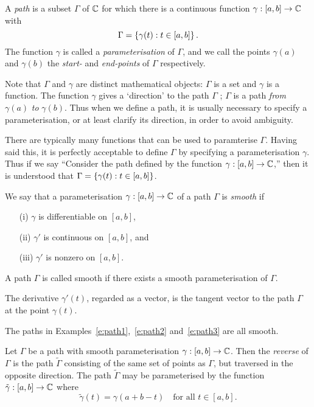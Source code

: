 \begin{definition}
A \emph{path} is a subset $\Gamma$ of $\mathbb{C}$ for which there is a continuous function $\gamma : [a,b] \to \mathbb{C}$ with
\[
\Gamma = \left\{ \gamma (t) : t \in [a,b] \right\}.
\]
The function $\gamma$ is called a \emph{parameterisation} of $\Gamma$, and we call the points $\gamma(a)$ and $\gamma(b)$ the \emph{start-} and \emph{end-points} of $\Gamma$ respectively.
\end{definition}
Note that $\Gamma$ and $\gamma$ are distinct mathematical objects: $\Gamma$ is a set and $\gamma$ is a function.  The function $\gamma$ gives a `direction' to the path $\Gamma$ ; $\Gamma$ is a path \emph{from} $\gamma (a)$ \emph{to} $\gamma(b)$. Thus when we define a path, it is usually necessary to specify a parameterisation, or at least clarify its direction, in order to avoid ambiguity.

There are typically many functions that can be used to paramterise $\Gamma$.  
Having said this, it is perfectly acceptable to define $\Gamma$ by specifying a parameterisation $\gamma$.  Thus if we say ``Consider the path defined by the function $\gamma:[a,b] \to \mathbb{C}$,'' then it is understood that $\Gamma = \left\{ \gamma (t) : t \in [a,b] \right\}$.


\begin{definition}
 We say that a parameterisation $\gamma:[a,b] \to \mathbb{C}$ of a path $\Gamma$ is \emph{smooth} if
\begin{enumerate}
\item[(i)] $\gamma$ is differentiable on $[a,b]$,
\item[(ii)] $\gamma'$ is continuous on $[a,b]$, and
\item[(iii)] $\gamma' $ is nonzero on $[a,b]$.
\end{enumerate}
A path $\Gamma$ is called smooth if there exists a smooth parameterisation of $\Gamma$.
\end{definition}

The derivative $\gamma'(t)$, regarded as a vector, is the tangent vector to the path $\Gamma$ at the point $\gamma (t)$.

The paths in Examples~\ref{e:path1},~\ref{e:path2} and~\ref{e:path3} are all smooth.

\begin{definition}
Let $\Gamma$ be a path with smooth parameterisation $\gamma: [a,b] \to \mathbb{C}$.  Then the \emph{reverse} of $\Gamma$ is the path $\tilde{\Gamma}$ consisting of the same set of points as $\Gamma$, but traversed in the opposite direction.  The path $\tilde{\Gamma}$ may be parameterised by the function $\tilde{\gamma} : [a,b] \to \mathbb{C}$ where
\[
\tilde{\gamma} (t) = \gamma (a+b-t) \quad \text{for all } t \in [a,b].
\]
\end{definition}
\begin{comment}
\begin{note}
Since we have defined $\Gamma$ to be a set of points, there is nothing to distinguish $\Gamma$ and $\tilde{\Gamma}$ - they both define the same subset of $\C$.  Hopefully this will not cause too much confusion.
\end{note}
\end{comment}

